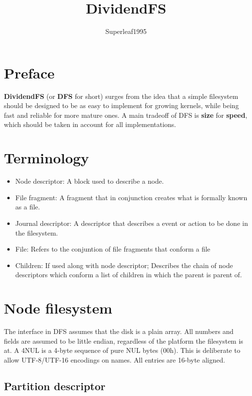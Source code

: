\documentclass[12pt]{article}
\title{DividendFS}
\author{Superleaf1995}
\begin{document}
\maketitle

\section{Preface}
\textbf{DividendFS} (or \textbf{DFS} for short) surges from the idea that a simple filesystem should be designed to be as easy to implement for growing kernels, while being fast and reliable for more mature ones.
A main tradeoff of DFS is \textbf{size} for \textbf{speed}, which should be taken in account for all implementations.

\section{Terminology}
\begin{itemize}
	\item Node descriptor: A block used to describe a node.
	\item File fragment: A fragment that in conjunction creates what is formally known as a file.
	\item Journal descriptor: A descriptor that describes a event or action to be done in the filesystem.
	\item File: Refers to the conjuntion of file fragments that conform a file
	\item Children: If used along with node descriptor; Describes the chain of node descriptors which conform a list of children in which the parent is parent of.
\end{itemize}

\section{Node filesystem}

The interface in DFS assumes that the disk is a plain array.
All numbers and fields are assumed to be little endian, regardless of the platform the filesystem is at.
A 4NUL is a 4-byte sequence of pure NUL bytes (00h). This is deliberate to allow UTF-8/UTF-16 encodings on names.
All entries are 16-byte aligned.

\subsection{Partition descriptor}
\end{document}
